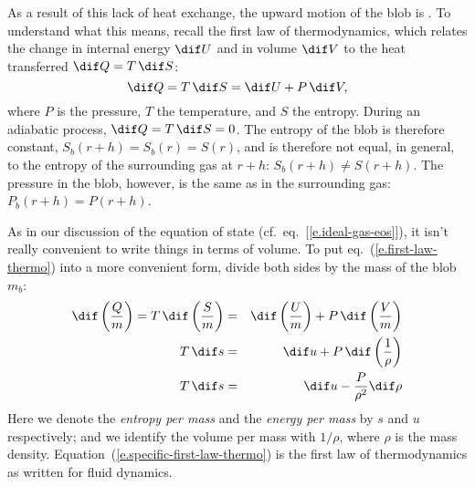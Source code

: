 As a result of this lack of heat exchange, the upward motion of the blob is .  
To understand what this means, recall the first law of thermodynamics, which relates the change in internal energy $\dif U$ and in volume $\dif V$ to the heat transferred $\dif Q = T\,\dif S$:
\begin{equation}\label{e.first-law-thermo}
	\dif Q = T\,\dif S = \dif U + P\,\dif V,
\end{equation}
where $P$ is the pressure, $T$ the temperature, and $S$ the entropy. During an adiabatic process, $\dif Q = T\,\dif S = 0$. The entropy of the blob is therefore constant, 
$S_{b}(r+h) = S_{b}(r) = S(r)$, and is therefore not equal, in general, to the entropy of the surrounding gas at $r+h$: $S_{b}(r+h)  \neq S(r+h)$. The pressure in the blob, however, is the same as in the surrounding gas: $P_{b}(r+h) = P(r+h)$.

As in our discussion of the equation of state (cf.\ eq.~[\ref{e.ideal-gas-eos}]), it isn't really convenient to write things in terms of volume. To put eq.~(\ref{e.first-law-thermo}) into a more convenient form, divide both sides by the mass of the blob $m_{b}$:
\begin{eqnarray}
	\dif\left(\frac{Q}{m}\right) = T\,\dif\left(\frac{S}{m}\right) &=&
		\dif\left(\frac{U}{m}\right) + P\,\dif\left(\frac{V}{m}\right)\nonumber\\
	T\,\dif s &=& \dif u + P\,\dif\left(\frac{1}{\rho}\right)\nonumber\\
	T\,\dif s &=& \dif u - \frac{P}{\rho^{2}}\dif\rho \label{e.specific-first-law-thermo}
\end{eqnarray}
Here we denote the \emph{entropy per mass} and the \emph{energy per mass} by $s$ and $u$ respectively; and we identify the volume per mass with $1/\rho$, where $\rho$ is the mass density. Equation~(\ref{e.specific-first-law-thermo}) is the first law of thermodynamics as written for fluid dynamics.

